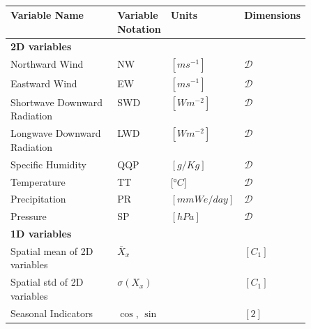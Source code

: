 \begin{table}[tbp]
    \centering
    \caption{}
    \renewcommand\arraystretch{1.5}
    \begin{tabular}{l>{\centering}p{0.1\linewidth}>{\centering}p{0.2\linewidth}>{\centering\arraybackslash}p{0.2\linewidth}}
    \toprule
        \textbf{Variable Name} & \textbf{Variable Notation} & \textbf{Units} & \textbf{Dimensions} \\ \toprule
        \textbf{2D variables} & & & \\ \bottomrule 
        Northward Wind & NW & $\si{[ms^{-1}]}$ & $\mathcal{D}$   \\ 
        Eastward Wind & EW & $\si{[ms^{-1}]}$ & $ \mathcal{D}$ \\
        Shortwave Downward Radiation & SWD & $\si{[Wm^{-2}]}$ & $ \mathcal{D}$ \\
        Longwave Downward Radiation & LWD & $\si{[Wm^{-2}]}$ & $\mathcal{D}$ \\
        Specific Humidity & QQP & $\si{[g/Kg]}$ & $\mathcal{D}$ \\
        Temperature & TT & $\si{[\degree C]}$ & $\mathcal{D}$ \\
        Precipitation & PR & $\si{[mmWe/day]}$ & $\mathcal{D}$  \\
        Pressure & SP & $\si{[hPa]}$ & $ \mathcal{D}$  \\
        \toprule
         \textbf{1D variables} & & & \\ \bottomrule
        Spatial mean of 2D variables & $\bar{X}_{x}$ & & $[C_1]$ \\ 
        Spatial std of 2D variables & $\sigma\left(X_{x}\right)$ & & $[C_1]$ \\
        Seasonal Indicators & $\cos$, $\sin$& & $[2]$\\ \bottomrule
        
    \end{tabular}
            \label{tab:features}
\end{table}